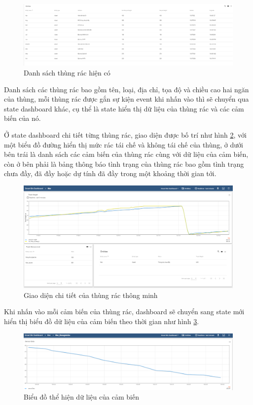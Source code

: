 \begin{figure}[H]
    \centering
    \includegraphics[width=\textwidth]{images/Khanh/Thingsboard/Dashboard_list.PNG}
    \caption{Danh sách thùng rác hiện có}
    \label{fig:dashboard_asset_list}
\end{figure}
Danh sách các thùng rác bao gồm tên, loại, địa chỉ, tọa độ và chiều cao hai ngăn của thùng, mỗi thùng rác được gắn sự kiện event khi nhấn vào thì sẽ chuyển qua state dashboard khác, cụ thể là state hiển thị dữ liệu của thùng rác và các cảm biến của nó.

Ở state dashboard chi tiết từng thùng rác, giao diện được bố trí như hình \ref{fig:bin_detail}, với một biểu đồ đường hiển thị mức rác tái chế và không tái chế của thùng, ở dưới bên trái là danh sách các cảm biến của thùng rác cùng với dữ liệu của cảm biến, còn ở bên phải là bảng thông báo tình trạng của thùng rác bao gồm tình trạng chưa đầy, đã đầy hoặc dự tính đã đầy trong một khoảng thời gian tới. 
\begin{figure}[H]
    \centering
    \includegraphics[width=\textwidth]{images/Khanh/Thingsboard/Bin_detail.PNG}
    \caption{Giao diện chi tiết của thùng rác thông minh}
    \label{fig:bin_detail}
\end{figure}

Khi nhấn vào mỗi cảm biến của thùng rác, dashboard sẽ chuyển sang state mới hiển thị biểu đồ dữ liệu của cảm biến theo thời gian như hình \ref{fig:sensor_detail}.
\begin{figure}[H]
    \centering
    \includegraphics[width=\textwidth]{images/Khanh/Thingsboard/Sensor_detail.PNG}
    \caption{Biểu đồ thể hiện dữ liệu của cảm biến}
    \label{fig:sensor_detail}
\end{figure}